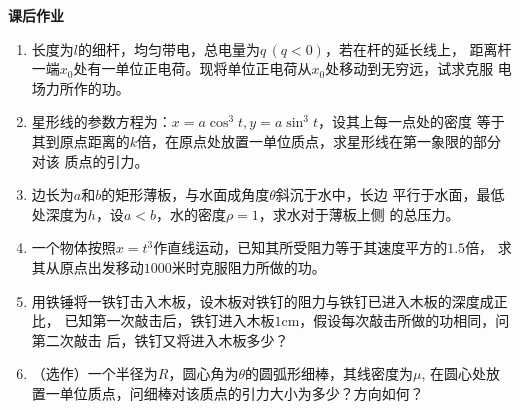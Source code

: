 \begin{ext}
	{\bf 课后作业}
	\begin{enumerate}
	  \item 长度为$l$的细杆，均匀带电，总电量为$q\,(q<0)$，若在杆的延长线上，
	  距离杆一端$x_0$处有一单位正电荷。现将单位正电荷从$x_0$处移动到无穷远，试求克服
	  电场力所作的功。
	  \item 星形线的参数方程为：$x=a\cos^3t,y=a\sin^3t$，设其上每一点处的密度
	  等于其到原点距离的$k$倍，在原点处放置一单位质点，求星形线在第一象限的部分对该
	  质点的引力。
	  \item 边长为$a$和$b$的矩形薄板，与水面成角度$\theta$斜沉于水中，长边
	  平行于水面，最低处深度为$h$，设$a<b$，水的密度$\rho=1$，求水对于薄板上侧
	  的总压力。
	  \item 一个物体按照$x=t^3$作直线运动，已知其所受阻力等于其速度平方的$1.5$倍，
	  求其从原点出发移动$1000$米时克服阻力所做的功。
	  \item 用铁锤将一铁钉击入木板，设木板对铁钉的阻力与铁钉已进入木板的深度成正比，
	  已知第一次敲击后，铁钉进入木板$1$cm，假设每次敲击所做的功相同，问第二次敲击
	  后，铁钉又将进入木板多少？
	  \item （选作）一个半径为$R$，圆心角为$\theta$的圆弧形细棒，其线密度为$\mu$,
	  在圆心处放置一单位质点，问细棒对该质点的引力大小为多少？方向如何？
	\end{enumerate}
\end{ext}

%
%
